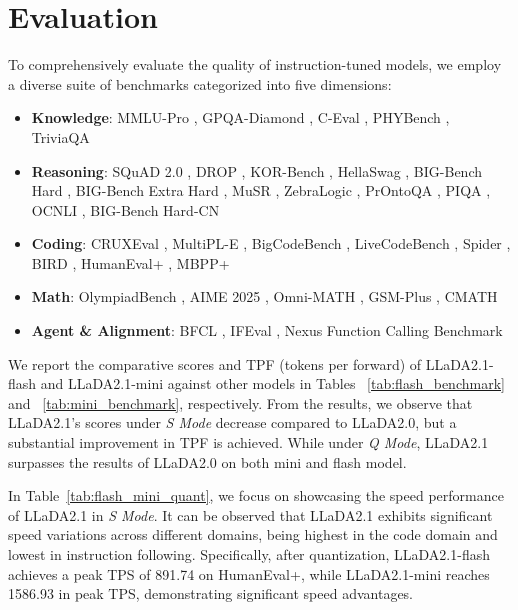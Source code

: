 \section{Evaluation}

To comprehensively evaluate the quality of instruction-tuned models, we employ a diverse suite of benchmarks categorized into five dimensions:

\begin{itemize}
    \item \textbf{Knowledge}: MMLU-Pro \citep{wang2024mmlupro}, GPQA-Diamond \citep{rein2024gpqa}, C-Eval \citep{huang2023ceval}, PHYBench \citep{qiu2025phybench}, TriviaQA \citep{joshi2017triviaqa}
    \item \textbf{Reasoning}: SQuAD 2.0 \citep{rajpurkar2018know}, DROP \citep{dua2019drop}, KOR-Bench \citep{ma2024kor}, HellaSwag \citep{zellers2019hellaswag}, BIG-Bench Hard \citep{suzgun2023challenging}, BIG-Bench Extra Hard \citep{kazemi2025big}, MuSR \citep{sprague2023musr}, ZebraLogic \citep{lin2025zebralogic}, PrOntoQA \citep{saparov2022language}, PIQA \citep{bisk2020piqa}, OCNLI \citep{hu2020ocnli}, BIG-Bench Hard-CN \citep{opencompass}
    \item \textbf{Coding}: CRUXEval \citep{gu2024cruxeval}, MultiPL-E \citep{cassano2023multiple}, BigCodeBench \citep{zhuo2024bigcodebench}, LiveCodeBench \citep{jain2024livecodebench}, Spider \citep{yu2018spider}, BIRD \citep{li2023can}, HumanEval+ \citep{liu2023your}, MBPP+ \citep{liu2023your}
    \item \textbf{Math}: OlympiadBench \citep{he2024olympiadbench}, AIME 2025 \citep{aime2025aime}, Omni-MATH \citep{gao2024omni}, GSM-Plus \citep{li2024gsm}, CMATH \citep{wei2023cmath}
    \item \textbf{Agent \& Alignment}: BFCL \citep{patil2025bfcl}, IFEval \citep{zhou2023ifeval}, Nexus Function Calling Benchmark \citep{nexusraven}
\end{itemize}

%
We report the comparative scores and TPF (tokens per forward) of LLaDA2.1-flash and LLaDA2.1-mini against other models in Tables ~\ref{tab:flash_benchmark} and ~\ref{tab:mini_benchmark}, respectively. From the results, we observe that LLaDA2.1’s scores under \textit{S Mode} decrease compared to LLaDA2.0, but a substantial improvement in TPF is achieved.  While under \textit{Q Mode}, LLaDA2.1 surpasses the results of LLaDA2.0 on both mini and flash model.



In Table~\ref{tab:flash_mini_quant}, we focus on showcasing the speed performance of LLaDA2.1 in \textit{S Mode}. It can be observed that LLaDA2.1 exhibits significant speed variations across different domains, being highest in the code domain and lowest in instruction following. Specifically, after quantization, LLaDA2.1-flash achieves a peak TPS of 891.74 on HumanEval+, while LLaDA2.1-mini reaches 1586.93 in peak TPS, demonstrating significant speed advantages.

